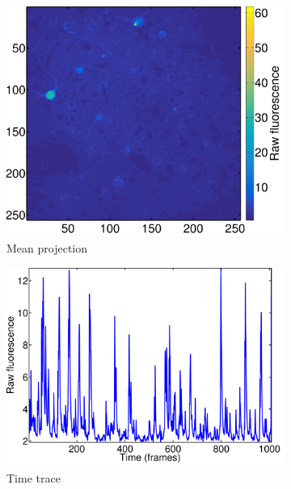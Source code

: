 \documentclass[paper=a4, fontsize=11pt]{scrartcl} %
\numberwithin{equation}{section} %
\numberwithin{figure}{section} %
\numberwithin{table}{section} %
\begin{document}
\begin{figure}
    \centering
    
    \begin{subfigure}[b]{0.3\textwidth}
    \includegraphics[width=\textwidth]{../MATLAB_complete/mean_image.pdf}
    \caption{Mean projection}
    \label{fig:mean_ca}
    \end{subfigure}
    \hfill
    \begin{subfigure}[b]{0.3\textwidth}
    \includegraphics[width=\textwidth]{../MATLAB_complete/trace_raw.pdf}
    \caption{Time trace}
    \label{fig:time_trace}
    \end{subfigure}
    \hfill
    \begin{subfigure}[b]{0.3\textwidth}

\end{subfigure}
\end{figure}
\end{document}
